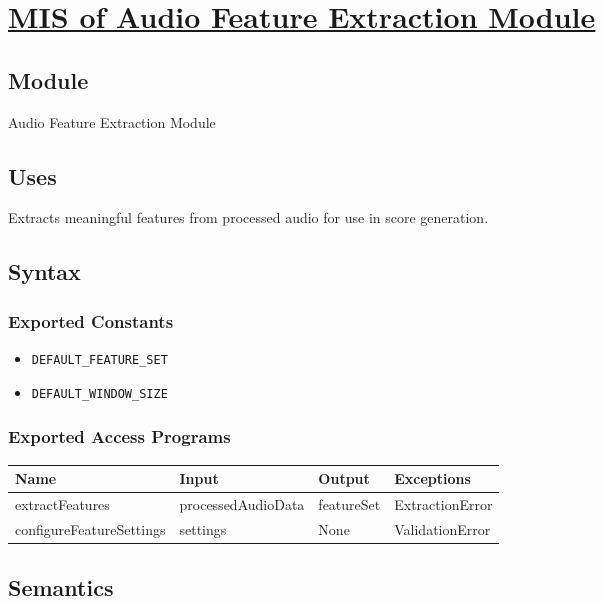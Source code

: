 \documentclass[12pt, titlepage]{article}
\begin{document}
\section{\hyperref[mAFE]{MIS of Audio Feature Extraction Module}} \label{M5}  

\subsection{Module}  
Audio Feature Extraction Module  

\subsection{Uses}  
Extracts meaningful features from processed audio for use in score generation.  

\subsection{Syntax}  

\subsubsection{Exported Constants}  
\begin{itemize}
    \item \texttt{DEFAULT\_FEATURE\_SET}  
    \item \texttt{DEFAULT\_WINDOW\_SIZE}  
\end{itemize}  

\subsubsection{Exported Access Programs}  
\begin{center}  
\begin{tabular}{|p{4.5cm}|p{4cm}|p{2.5cm}|p{3cm}|}  
\hline  
\textbf{Name} & \textbf{Input} & \textbf{Output} & \textbf{Exceptions} \\  
\hline  
extractFeatures & processedAudioData & featureSet & ExtractionError \\  
configureFeatureSettings & settings & None & ValidationError \\  
\hline  
\end{tabular}  
\end{center}  

\subsection{Semantics}  
\end{document}
